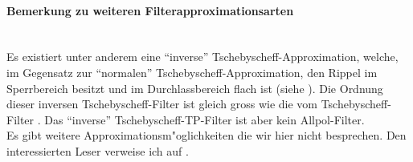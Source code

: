 \paragraph{Bemerkung zu weiteren Filterapproximationsarten}~\\
Es existiert unter anderem eine ``inverse''
Tschebyscheff-Approximation, welche, im
Gegensatz zur ``normalen''
Tschebyscheff-Approximation, den
Rippel im Sperrbereich besitzt und im Durchlassbereich flach ist
(siehe ). Die Ordnung dieser inversen
Tschebyscheff-Filter ist gleich gross wie die vom Tschebyscheff-Filter
\cite{VAL:82}. Das ``inverse'' Tschebyscheff-TP-Filter ist aber kein
Allpol-Filter. \\ Es gibt weitere Approximationsm"oglichkeiten die wir
hier nicht besprechen. Den interessierten Leser verweise ich auf
\cite{VAL:82, ZVE:67}.  \clearpage